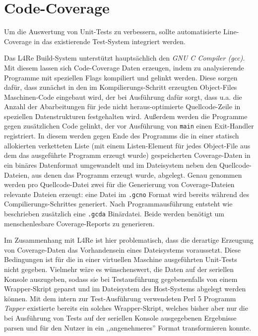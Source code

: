 \section{Code-Coverage}

Um die Auswertung von Unit-Tests zu verbessern, sollte automatisierte
Line-Coverage in das existierende Test-System integriert werden.

Das L4Re Build-System unterstützt hauptsächlich den \textit{GNU C Compiler
(gcc)}.  Mit diesem lassen sich Code-Coverage Daten erzeugen, indem zu
analysierende Programme mit speziellen Flags kompiliert und gelinkt werden.
Diese sorgen dafür, dass zunächst in den im Kompilierungs-Schritt erzeugten
Object-Files Maschinen-Code eingebaut wird, der bei Ausführung dafür sorgt,
dass u.a. die Anzahl der Abarbeitungen für jede nicht heraus-optimierte
Quellcode-Zeile in speziellen Datenstrukturen festgehalten wird. Außerdem
werden die Programme gegen zusätzlichen Code gelinkt, der vor Ausführung von
\texttt{main} einen Exit-Handler registriert. In diesem werden gegen Ende des
Programms die in einer statisch allokierten verketteten Liste (mit einem
Listen-Element für jedes Object-File aus dem das ausgeführte Programm erzeugt
wurde) gespeicherten Coverage-Daten in ein binäres Datenformat umgewandelt und
im Dateisystem neben den Quellcode-Dateien, aus denen das Programm erzeugt
wurde, abgelegt. Genau genommen werden pro Quellcode-Datei zwei für die
Generierung von Coverage-Dateien relevante Dateien erzeugt: eine Datei im
\texttt{.gcno} Format wird bereits während des Compilierungs-Schrittes
generiert. Nach Programmausführung entsteht wie beschrieben zusätzlich eine
\texttt{.gcda} Binärdatei. Beide werden benötigt um menschenlesbare
Coverage-Reports zu generieren.

Im Zusammenhang mit L4Re ist hier problematisch, dass die derartige Erzeugung
von Coverage-Daten das Vorhandensein eines Dateisystems voraussetzt.  Diese
Bedingungen ist für die in einer virtuellen Maschine ausgeführten Unit-Tests
nicht gegeben. Vielmehr wäre es wünschenswert, die Daten auf der seriellen
Konsole auszugeben, sodass sie bei Testausführung gegebenenfalls von einem
Wrapper-Skript geparst und im Dateisystem des Host-Systems abgelegt werden
können. Mit dem intern zur Test-Ausführung verwendeten Perl 5 Programm
\textit{Tapper} existierte bereits ein solches Wrapper-Skript, welches bisher
aber nur die bei Ausführung von Tests auf der seriellen Konsole ausgegebenen
Ergebnisse parsen und für den Nutzer in ein ,,angenehmeres'' Format
transformieren konnte.

